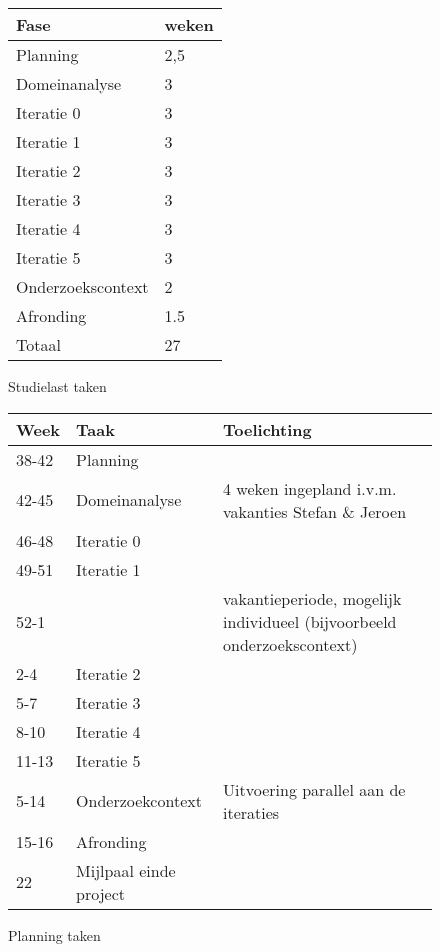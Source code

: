 \begin{figure}[h]
\begin{tabular}{ll}\hline
{\bf Fase}    & {\bf weken}\\\hline
Planning             & 2,5 \\
Domeinanalyse        & 3 \\
\hline
Iteratie 0           & 3 \\
Iteratie 1           & 3 \\
Iteratie 2           & 3 \\
Iteratie 3           & 3 \\
Iteratie 4           & 3 \\
Iteratie 5           & 3 \\
\hline
Onderzoekscontext     &	2 \\
Afronding	     & 1.5 \\
\hline
Totaal               & 27 \\
\end{tabular}
\caption{Studielast taken}
\end{figure}

\begin{figure}[h]
\begin{tabular}{llp{7cm}}\hline
{\bf Week}    & {\bf Taak}  & {\bf Toelichting}\\\hline
38-42         & Planning    \\
42-45         & Domeinanalyse & 4 weken ingepland i.v.m. vakanties Stefan \& Jeroen \\
46-48         & Iteratie 0    \\
49-51         & Iteratie 1    \\
52-1          &               & vakantieperiode, mogelijk
				individueel (bijvoorbeeld onderzoekscontext) \\
2-4           & Iteratie 2    \\
5-7           & Iteratie 3    \\
8-10          & Iteratie 4    \\
11-13         & Iteratie 5    \\

5-14          & Onderzoekcontext & Uitvoering parallel aan de iteraties \\
15-16         & Afronding     \\

22            & Mijlpaal einde project
\end{tabular}
\caption{Planning taken}
\end{figure}

